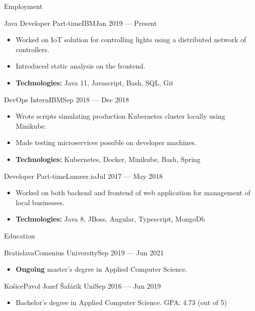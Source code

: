\documentclass[]{style}
\begin{document}
	\makeheader

	\begin{cvsection}{Employment}
    	\begin{cvsubsection}{Java Developer Part-time}{IBM}{Jan 2019 — Present}
			\begin{itemize}
    			\item Worked on IoT solution for controlling lights using a distributed network of controllers.
    			\item Introduced static analysis on the frontend.
    			\item \textbf{Technologies:} Java 11, Javascript, Bash, SQL, Git
			\end{itemize}
		\end{cvsubsection}
		
    	\begin{cvsubsection}{DevOps Intern}{IBM}{Sep 2018 — Dec 2018}
			\begin{itemize}
			    \item Wrote scripts simulating production Kubernetes cluster locally using Minikube.
			    \item Made testing microservices possible on developer machines.
			    \item \textbf{Technologies:} Kubernetes, Docker, Minikube, Bash, Spring
			\end{itemize}
		\end{cvsubsection}
		
		\begin{cvsubsection}{Developer Part-time}{Lumeer.io}{Jul 2017 — May 2018}
			\begin{itemize}
			    \item Worked on both backend and frontend of web application for management of local businesses.
				\item \textbf{Technologies:} Java 8, JBoss, Angular, Typescript, MongoDb
			\end{itemize}
		\end{cvsubsection}
	\end{cvsection}
	
	\begin{cvsection}{Education}
		\begin{cvsubsection}{Bratislava}{Comenius University}{Sep 2019 — Jun 2021}
			\begin{itemize}
				\item \textbf{Ongoing} master's degree in Applied Computer Science.
			\end{itemize}
		\end{cvsubsection}
	
		\begin{cvsubsection}{Košice}{Pavol Jozef Šafárik Uni}{Sep 2016 — Jun 2019}
			\begin{itemize}
				\item Bachelor's degree in Applied Computer Science. GPA: 4.73 (out of 5)
			\end{itemize}
		\end{cvsubsection}
	\end{cvsection}
	
\end{document}
